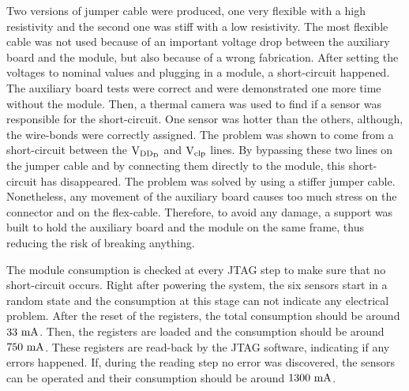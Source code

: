   Two versions of jumper cable were produced, one very flexible with a high resistivity and the second one was stiff with a low resistivity.
  The most flexible cable was not used because of an important voltage drop between the auxiliary board and the module, but also because of a wrong fabrication.
  After setting the voltages to nominal values and plugging in a module, a short-circuit happened.
  The auxiliary board tests were correct and were demonstrated one more time without the module.
  Then, a thermal camera was used to find if a sensor was responsible for the short-circuit.
  One sensor was hotter than the others, although, the wire-bonds were correctly assigned.
  The problem was shown to come from a short-circuit between the $\rm{V}_{\rm{DD_D}}$ and $\rm{V}_{\rm{clp}}$ lines.
  By bypassing these two lines on the jumper cable and by connecting them directly to the module, this short-circuit has disappeared.
  The problem was solved by using a stiffer jumper cable.
  Nonetheless, any movement of the auxiliary board causes too much stress on the connector and on the flex-cable.
  Therefore, to avoid any damage, a support was built to hold the auxiliary board and the module on the same frame, thus reducing the risk of breaking anything.

  The module consumption is checked at every \gls{JTAG} step to make sure that no short-circuit occurs.
  Right after powering the system, the six sensors start in a random state and the consumption at this stage can not indicate any electrical problem.
  After the reset of the registers, the total consumption should be around $33~\rm{mA}$.
  Then, the registers are loaded and the consumption should be around $750~\rm{mA}$.
  These registers are read-back by the \gls{JTAG} software, indicating if any errors happened.
  If, during the reading step no error was discovered, the sensors can be operated and their consumption should be around $1300~\rm{mA}$.



